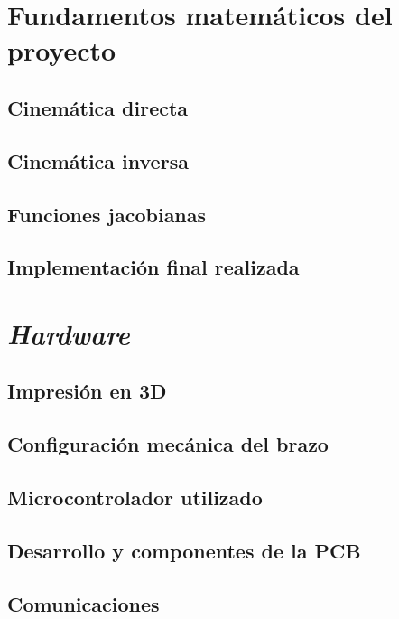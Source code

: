 \chapter{Fundamentos matemáticos del proyecto}
\label{chap:maths}

\section{Cinemática directa}

\section{Cinemática inversa}

\section{Funciones jacobianas}

\section{Implementación final realizada}


\chapter{\textit{Hardware}}
\label{chap:hardware}

\section{Impresión en 3D}

\section{Configuración mecánica del brazo}

\section{Microcontrolador utilizado}

\section{Desarrollo y componentes de la PCB}

\section{Comunicaciones}

